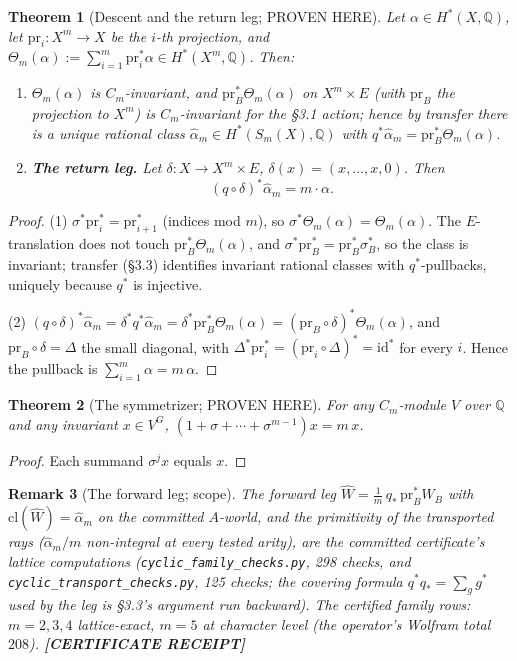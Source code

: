 \documentclass[11pt]{article}
\newtheorem{theorem}{Theorem}
\newtheorem{remark}[theorem]{Remark}
\newcommand{\Q}{\mathbb Q}
\begin{document}
\begin{theorem}[Descent and the return leg; PROVEN HERE]
Let $\alpha\in H^*(X,\Q)$, let
$\mathrm{pr}_i\colon X^m\to X$ be the $i$-th projection, and
$\Theta_m(\alpha):=\sum_{i=1}^m\mathrm{pr}_i^*\alpha\in
H^*(X^m,\Q)$. Then:
\begin{enumerate}
\item $\Theta_m(\alpha)$ is $C_m$-invariant, and
$\mathrm{pr}_B^*\Theta_m(\alpha)$ on $X^m\times E$ (with
$\mathrm{pr}_B$ the projection to $X^m$) is $C_m$-invariant for the
\S3.1 action; hence by transfer there is a unique rational class
$\widehat\alpha_m\in H^*(S_m(X),\Q)$ with
$q^*\widehat\alpha_m=\mathrm{pr}_B^*\Theta_m(\alpha)$.
\item \textbf{The return leg.} Let $\delta\colon X\to X^m\times E$,
$\delta(x)=(x,\dots,x,0)$. Then
\[
(q\circ\delta)^*\widehat\alpha_m=m\cdot\alpha .
\]
\end{enumerate}
\end{theorem}

\begin{proof}
(1) $\sigma^*\mathrm{pr}_i^*=\mathrm{pr}_{i+1}^*$ (indices mod $m$), so
$\sigma^*\Theta_m(\alpha)=\Theta_m(\alpha)$. The $E$-translation does
not touch $\mathrm{pr}_B^*\Theta_m(\alpha)$, and
$\sigma^*\mathrm{pr}_B^*=\mathrm{pr}_B^*\sigma_B^*$, so the class is
invariant; transfer (\S3.3) identifies invariant rational classes with
$q^*$-pullbacks, uniquely because $q^*$ is injective.

(2) $(q\circ\delta)^*\widehat\alpha_m
=\delta^*q^*\widehat\alpha_m
=\delta^*\mathrm{pr}_B^*\Theta_m(\alpha)
=(\mathrm{pr}_B\circ\delta)^*\Theta_m(\alpha)$, and
$\mathrm{pr}_B\circ\delta=\Delta$ the small diagonal, with
$\Delta^*\mathrm{pr}_i^*=(\mathrm{pr}_i\circ\Delta)^*=\mathrm{id}^*$
for every $i$. Hence the pullback is
$\sum_{i=1}^m\alpha=m\,\alpha$.
\end{proof}

\begin{theorem}[The symmetrizer; PROVEN HERE]
For any $C_m$-module $V$ over $\Q$ and any invariant $x\in V^G$,
$(1+\sigma+\cdots+\sigma^{m-1})x=m\,x$.
\end{theorem}

\begin{proof}
Each summand $\sigma^j x$ equals $x$.
\end{proof}

\begin{remark}[The forward leg; scope]
The forward leg
$\widehat W=\frac1m\,q_*\,\mathrm{pr}_B^*W_B$ with
$\mathrm{cl}(\widehat W)=\widehat\alpha_m$ on the committed $A$-world,
and the primitivity of the transported rays
($\widehat\alpha_m/m$ non-integral at every tested arity), are the
committed certificate's lattice computations
(\texttt{cyclic\_family\_checks.py}, 298 checks, and
\texttt{cyclic\_transport\_checks.py}, 125 checks; the covering formula
$q^*q_*=\sum_g g^*$ used by the leg is \S3.3's argument run backward).
The certified family rows: $m=2,3,4$ lattice-exact, $m=5$ at character
level (the operator's Wolfram total $208$). \textbf{[CERTIFICATE
RECEIPT]}
\end{remark}
\end{document}
